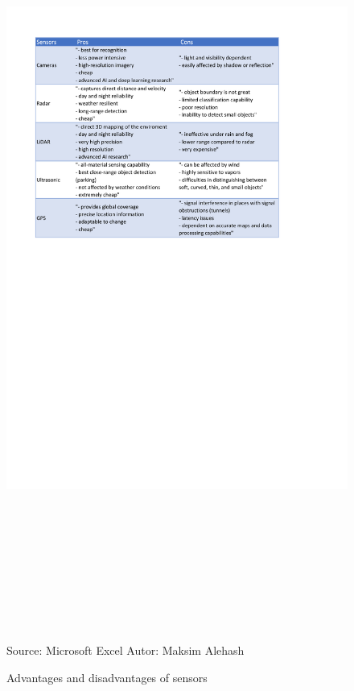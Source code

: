 \documentclass[10pt,oneside,english,a4paper]{article}
\begin{document}
\begin{figure}
\centering
\hspace{-4cm}
\vspace{1cm}
\includegraphics[height=25cm, width=20cm]{tabulka.pdf}
\vspace{-14cm}
\caption{Advantages and disadvantages of sensors}
{Source: Microsoft Excel}
{Autor: Maksim Alehash}
\label{fig:p_tabulka}
\end{figure}
\end{document}
